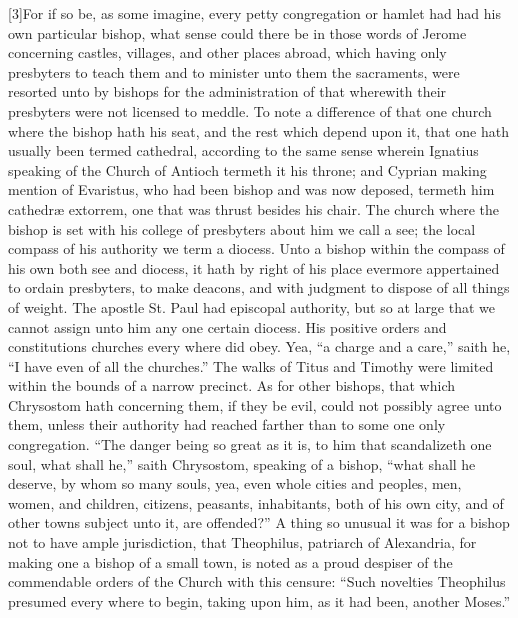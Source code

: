 [3]For if so be, as some imagine, every petty congregation or hamlet had had his own particular bishop, what sense could there be in those words of Jerome concerning castles, villages, and other places abroad, which having only presbyters to teach them and to minister unto them the sacraments, were resorted unto by bishops for the administration of that wherewith their presbyters were not licensed to meddle. To note a difference of that one church where the bishop hath his seat, and the rest which depend upon it, that one hath usually been termed cathedral, according to the same sense wherein Ignatius speaking of the Church of Antioch termeth it his throne; and Cyprian making mention of Evaristus, who had been bishop and was now deposed, termeth him cathedræ extorrem, one that was thrust besides his chair. The church where the bishop is set with his college of presbyters about him we call a see; the local compass of his authority we term a diocess. Unto a bishop within the compass of his own both see and diocess, it hath by right of his place evermore appertained to ordain presbyters,  to make deacons,
 and with judgment to dispose of all things of weight. The apostle St. Paul had episcopal authority, but so at large that we cannot assign unto him any one certain diocess. His positive orders and constitutions churches every where did obey. Yea, “a charge and a care,” saith he, “I have even of all the churches.” The walks of Titus and Timothy were limited within the bounds of a narrow precinct. As for other bishops, that which Chrysostom hath concerning them, if they be evil, could not possibly agree unto them, unless their authority had reached farther than to some one only congregation. “The danger being so great as it is, to him that scandalizeth one soul, what shall he,” saith Chrysostom, speaking of a bishop, “what shall he deserve, by whom so many souls, yea, even whole cities and peoples, men, women, and children, citizens, peasants, inhabitants, both of his own city, and of other towns subject unto it, are offended?” A thing so unusual it was for a bishop not to have ample jurisdiction, that Theophilus, patriarch of Alexandria, for making one a bishop of a small town, is noted as a proud despiser of the commendable orders of the Church with this censure: “Such novelties Theophilus presumed every where to begin, taking upon him, as it had been, another Moses.”

